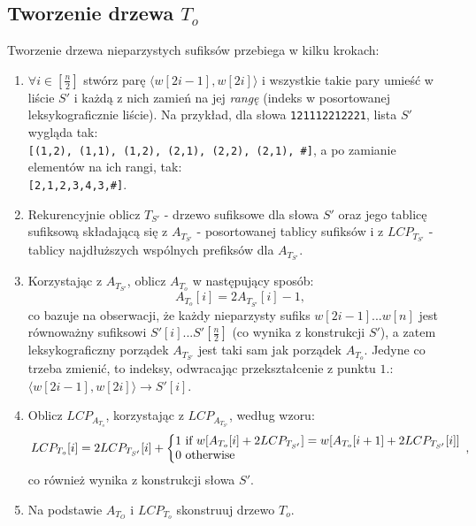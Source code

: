     \subsection{Tworzenie drzewa $T_o$}
    Tworzenie drzewa nieparzystych sufiksów przebiega w kilku krokach:
    \begin{enumerate}
     \item $\forall i \in [\frac{n}{2}]$ stwórz parę $\langle w[2i-1], w[2i] \rangle$ i wszystkie takie pary umieść w liście $S'$ i każdą z nich zamień na jej \textit{rangę} (indeks w posortowanej leksykograficznie liście). Na przykład, dla słowa \verb|121112212221|, lista $S'$ wygląda tak: \\
     \verb|[(1,2), (1,1), (1,2), (2,1), (2,2), (2,1), #]|, a po zamianie elementów na ich rangi, tak: \\
     \verb|[2,1,2,3,4,3,#]|.
     \item Rekurencyjnie oblicz $T_{S'}$ - drzewo sufiksowe dla słowa $S'$ oraz jego tablicę sufiksową składającą się z $A_{T_{S'}}$ - posortowanej tablicy sufiksów i z $LCP_{T_{S'}}$ - tablicy najdłuższych wspólnych prefiksów dla $A_{T_{S'}}$.
     \item Korzystając z $A_{T_{S'}}$, oblicz $A_{T_o}$ w następujący sposób:
     $$
        A_{T_o}[i] = 2A_{T_{S'}}[i] - 1,
     $$
     co bazuje na obserwacji, że każdy nieparzysty sufiks $w[2i-1]...w[n]$ jest równoważny sufiksowi $S'[i]...S'[\frac{n}{2}]$ (co wynika z konstrukcji $S'$), a zatem leksykograficzny porządek $A_{T_{S'}}$ jest taki sam jak porządek $A_{T_o}$. Jedyne co trzeba zmienić, to indeksy, odwracając przekształcenie z punktu $1.$: $\langle w[2i-1],w[2i] \rangle \rightarrow S'[i]$.
     \item Oblicz $LCP_{A_{T_o}}$, korzystając z $LCP_{A_{T_{S'}}}$, według wzoru:
      \begin{align*}
      \left.
       LCP_{T_o}[i] = 2LCP_{T_{S'}}[i] + \bigg\{
       \begin{array}{@{}l}
        1 \text{ if } w[A_{T_o}[i] + 2LCP_{T_{S'}}] = w[A_{T_o}[i+1] + 2LCP_{T_{S'}}[i]]   \\
        0 \text{ otherwise}
       \end{array},
        \right.              
      \end{align*}
      co również wynika z konstrukcji słowa $S'$.
    \item Na podstawie $A_{T_O}$ i $LCP_{T_o}$ skonstruuj drzewo $T_o$.
    \end{enumerate}
